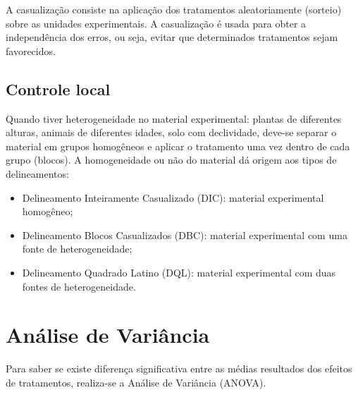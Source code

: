 \documentclass[12pt,brazil,oneside]{book}
\begin{document}
A casualização consiste na aplicação dos tratamentos aleatoriamente
(sorteio) sobre as unidades experimentais. A casualização é usada para
obter a independência dos erros, ou seja, evitar que determinados
tratamentos sejam favorecidos.

\hypertarget{controle-local}{%
\subsection{Controle local}\label{controle-local}}

Quando tiver heterogeneidade no material experimental: plantas de
diferentes alturas, animais de diferentes idades, solo com declividade,
deve-se separar o material em grupos homogêneos e aplicar o tratamento
uma vez dentro de cada grupo (blocos). A homogeneidade ou não do
material dá origem aos tipos de delineamentos:

\begin{itemize}
\item
  Delineamento Inteiramente Casualizado (DIC): material experimental
  homogêneo;
\item
  Delineamento Blocos Casualizados (DBC): material experimental com uma
  fonte de heterogeneidade;
\item
  Delineamento Quadrado Latino (DQL): material experimental com duas
  fontes de heterogeneidade.
\end{itemize}

\hypertarget{analise-de-variancia}{%
\section{Análise de Variância}\label{analise-de-variancia}}

Para saber se existe diferença significativa entre as médias resultados
dos efeitos de tratamentos, realiza-se a Análise de Variância (ANOVA).
\end{document}
